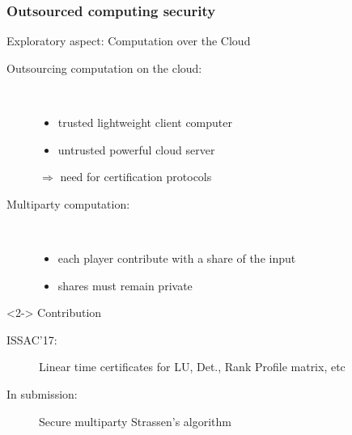 \documentclass{beamer}
\begin{document}
\begin{frame}
  \frametitle{Outsourced computing security}

  \begin{block}{Exploratory aspect: Computation over the Cloud}
    \begin{description}
    \item[Outsourcing computation on the cloud:]\ 
      \begin{itemize}
      \item trusted lightweight client computer
      \item untrusted powerful cloud server
      \end{itemize}
      $\Rightarrow$ need for certification protocols
    \item[Multiparty computation:] \
      \begin{itemize}
      \item each player contribute with a share of the input
      \item shares must remain private
      \end{itemize}
    \end{description}
\end{block}
  \begin{block}<2->
      {Contribution}
      \begin{description}
        \item[ISSAC'17:] Linear time certificates for LU, Det., Rank Profile  matrix, etc
        \item[In submission:] Secure multiparty Strassen's algorithm
      \end{description}
  \end{block}

\end{frame}
\end{document}
